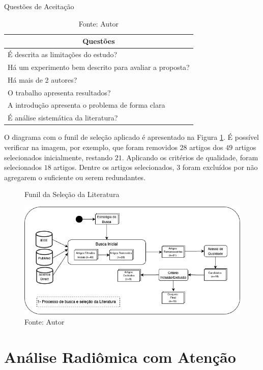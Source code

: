 \begin{table}[hbtp]
    \centering
    \caption{Questões de Aceitação}
    \renewcommand{\arraystretch}{1.4} %
    \begin{tabular}{|l|}
    \hline 
          \multicolumn{1}{|c|}{\textbf{Questões}} \\ 
    \hline 
        \quad É descrita as limitações do estudo? \\
        \quad Há um experimento bem descrito para avaliar a proposta? \\
        \quad Há mais de 2 autores? \\
        \quad O trabalho apresenta resultados? \\
        \quad A introdução apresenta o problema de forma clara \\
        \quad É análise sistemática da literatura? \\
    \hline 
    \end{tabular} 
    \caption*{Fonte: Autor}
    \label{tab:questoes}
\end{table}

O diagrama com o funil de seleção aplicado é apresentado na Figura \ref{fig:fig021}. É possível verificar na imagem, por exemplo, que foram removidos $28$ artigos dos $49$ artigos selecionados inicialmente, restando $21$. Aplicando os critérios de qualidade, foram selecionados $18$ artigos. Dentre os artigos selecionados, $3$ foram excluídos por não agregarem o suficiente ou serem redundantes.

\begin{figure}[h!]
    \centering
    \caption{Funil da Seleção da Literatura}
    \includegraphics[width=1\textwidth]{figures/fig021.png}
    \caption*{Fonte: Autor}
    \label{fig:fig021}
\end{figure}
\section{Análise Radiômica com Atenção}
\label{sec:analise_radiomica}

